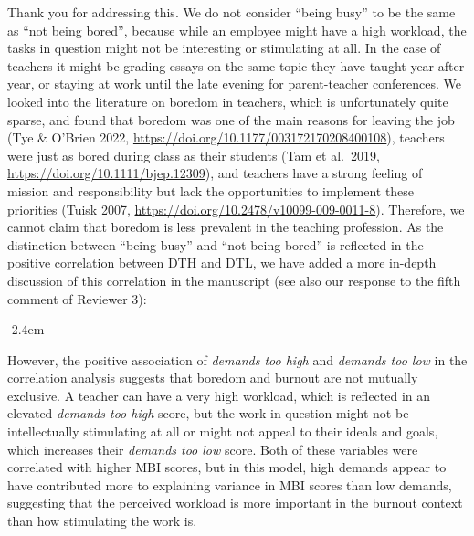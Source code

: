 \documentclass[draft]{article}
\renewenvironment{quote}{\begin{fquote}\advance\leftmargini -2.4em\begin{oldquote}}{\end{oldquote}\end{fquote}}
\newenvironment{fquote}
  {\def\FrameCommand{
	\fboxsep=0.6em %
	\fcolorbox{black}{white}}%
    \MakeFramed {\advance\hsize-2\width \FrameRestore}
    \begin{minipage}{\linewidth}
  }
  {\end{minipage}\endMakeFramed}
\begin{document}
Thank you for addressing this.
We do not consider ``being busy'' to be the same as ``not being bored'', because while an employee might have a high workload, the tasks in question might not be interesting or stimulating at all.
In the case of teachers it might be grading essays on the same topic they have taught year after year, or staying at work until the late evening for parent-teacher conferences.
We looked into the literature on boredom in teachers, which is unfortunately quite sparse, and found that boredom was one of the main reasons for leaving the job (Tye \& O'Brien 2022, \url{https://doi.org/10.1177/003172170208400108}), teachers were just as bored during class as their students (Tam et al.~2019, \url{https://doi.org/10.1111/bjep.12309}), and teachers have a strong feeling of mission and responsibility but lack the opportunities to implement these priorities (Tuisk 2007, \url{https://doi.org/10.2478/v10099-009-0011-8}).
Therefore, we cannot claim that boredom is less prevalent in the teaching profession.
As the distinction between ``being busy'' and ``not being bored'' is reflected in the positive correlation between DTH and DTL, we have added a more in-depth discussion of this correlation in the manuscript (see also our response to the fifth comment of Reviewer 3):

\begin{quote}
However, the positive association of \emph{demands too high} and \emph{demands too low} in the correlation analysis suggests that boredom and burnout are not mutually exclusive.
A teacher can have a very high workload, which is reflected in an elevated \emph{demands too high} score, but the work in question might not be intellectually stimulating at all or might not appeal to their ideals and goals, which increases their \emph{demands too low} score.
Both of these variables were correlated with higher MBI scores, but in this model, high demands appear to have contributed more to explaining variance in MBI scores than low demands, suggesting that the perceived workload is more important in the burnout context than how stimulating the work is.
\end{quote}

\end{document}

